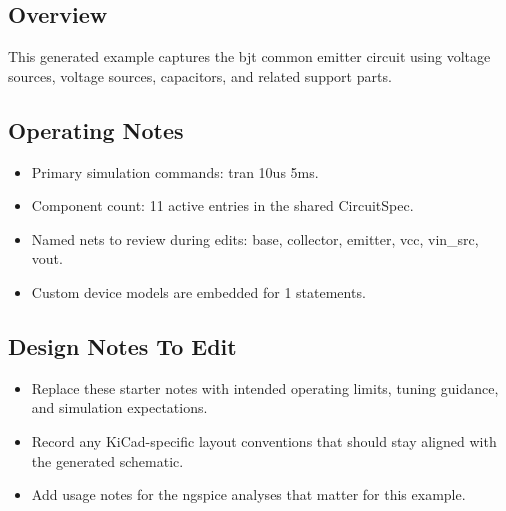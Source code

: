 \subsection*{Overview}
This generated example captures the bjt common emitter circuit using voltage sources, voltage sources, capacitors, and related support parts.

\subsection*{Operating Notes}
\begin{itemize}
  \item Primary simulation commands: tran 10us 5ms.
  \item Component count: 11 active entries in the shared CircuitSpec.
  \item Named nets to review during edits: base, collector, emitter, vcc, vin\_src, vout.
  \item Custom device models are embedded for 1 statements.
\end{itemize}
\subsection*{Design Notes To Edit}
\begin{itemize}
  \item Replace these starter notes with intended operating limits, tuning guidance, and simulation expectations.
  \item Record any KiCad-specific layout conventions that should stay aligned with the generated schematic.
  \item Add usage notes for the ngspice analyses that matter for this example.
\end{itemize}
